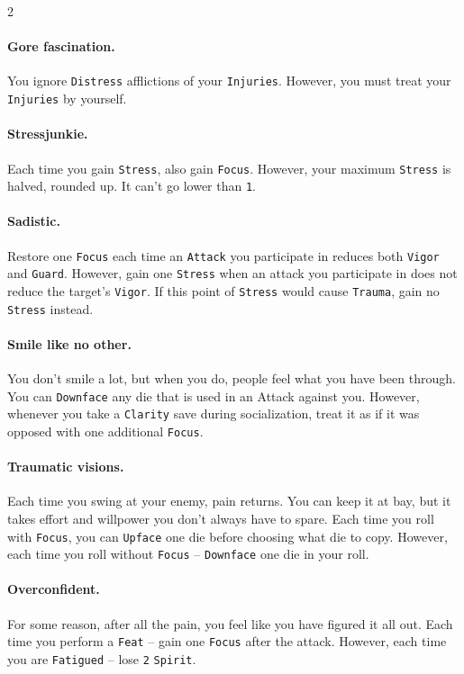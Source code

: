 \begin{multicols*}{2}
\paragraph{Gore fascination.} You ignore \texttt{Distress} afflictions of your \texttt{Injuries}.
However, you must treat your \texttt{Injuries} by yourself.

\paragraph{Stressjunkie.} Each time you gain \texttt{Stress}, also gain \texttt{Focus}.
However, your maximum \texttt{Stress} is halved, rounded up. It can't go lower than \texttt{1}.

\paragraph{Sadistic.} Restore one \texttt{Focus} each time an \texttt{Attack} you participate in reduces both \texttt{Vigor} and \texttt{Guard}.
However, gain one \texttt{Stress} when an attack you participate in does not reduce the target's \texttt{Vigor}. If this point of \texttt{Stress} would cause \texttt{Trauma}, gain no \texttt{Stress} instead.

\paragraph{Smile like no other.} You don't smile a lot, but when you do, people feel what you have been through.
You can \texttt{Downface} any die that is used in an Attack against you.
However, whenever you take a \texttt{Clarity} save during socialization, treat it as if it was opposed with one additional \texttt{Focus}.

\paragraph{Traumatic visions.} Each time you swing at your enemy, pain returns. You can keep it at bay, but it takes effort and willpower you don't always have to spare.
Each time you roll with \texttt{Focus}, you can \texttt{Upface} one die before choosing what die to copy. 
However, each time you roll without \texttt{Focus} -- \texttt{Downface} one die in your roll.

\paragraph{Overconfident.} For some reason, after all the pain, you feel like you have figured it all out. Each time you perform a \texttt{Feat} -- gain one \texttt{Focus} after the attack. 
However, each time you are \texttt{Fatigued} -- lose \texttt{2} \texttt{Spirit}.


\end{multicols*}
